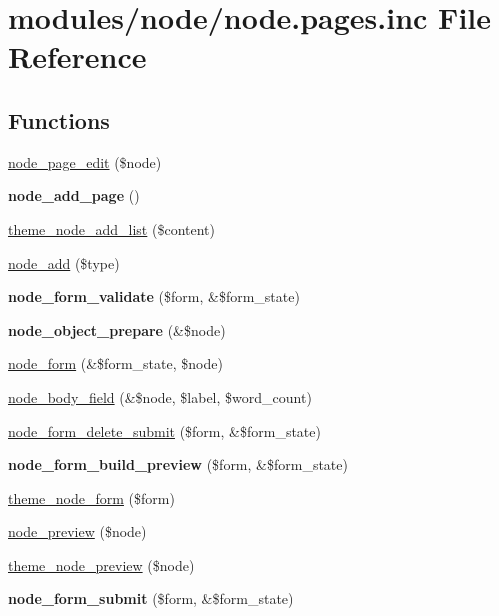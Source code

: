 \hypertarget{node_8pages_8inc}{
\section{modules/node/node.pages.inc File Reference}
\label{node_8pages_8inc}
}
\subsection*{Functions}
\begin{CompactItemize}
\item 
\hyperlink{node_8pages_8inc_553fc35bb17545341a3fcc36360fb43b}{node\_\-page\_\-edit} (\$node)
\item 
\hypertarget{node_8pages_8inc_c51e34d673a1de68491ea88ea30832b9}{
\textbf{node\_\-add\_\-page} ()}
\label{node_8pages_8inc_c51e34d673a1de68491ea88ea30832b9}

\item 
\hyperlink{group__themeable_g8eb0074d64a1c80291b651316f9b0659}{theme\_\-node\_\-add\_\-list} (\$content)
\item 
\hyperlink{node_8pages_8inc_29be8dfd0fadad9f4399d50ab3615461}{node\_\-add} (\$type)
\item 
\hypertarget{node_8pages_8inc_edf9f810594bc4c402a92cb197930bd9}{
\textbf{node\_\-form\_\-validate} (\$form, \&\$form\_\-state)}
\label{node_8pages_8inc_edf9f810594bc4c402a92cb197930bd9}

\item 
\hypertarget{node_8pages_8inc_26ccc9a4ef05bacb4b1f35af1e5937d4}{
\textbf{node\_\-object\_\-prepare} (\&\$node)}
\label{node_8pages_8inc_26ccc9a4ef05bacb4b1f35af1e5937d4}

\item 
\hyperlink{node_8pages_8inc_0f0be559fe5085e67454b0bd73b1b282}{node\_\-form} (\&\$form\_\-state, \$node)
\item 
\hyperlink{node_8pages_8inc_9d45bd087e06dbb6570dd7e9f453c7e6}{node\_\-body\_\-field} (\&\$node, \$label, \$word\_\-count)
\item 
\hyperlink{node_8pages_8inc_5cdd62f89098801ac87b85d8c61e7ee2}{node\_\-form\_\-delete\_\-submit} (\$form, \&\$form\_\-state)
\item 
\hypertarget{node_8pages_8inc_71425b02d4c0dd3af239bffdd7e1649b}{
\textbf{node\_\-form\_\-build\_\-preview} (\$form, \&\$form\_\-state)}
\label{node_8pages_8inc_71425b02d4c0dd3af239bffdd7e1649b}

\item 
\hyperlink{group__themeable_g446a4c85c20acb7a6447d0acbe0d0210}{theme\_\-node\_\-form} (\$form)
\item 
\hyperlink{node_8pages_8inc_774d9df7be341a7c9058555e8cfb4b2b}{node\_\-preview} (\$node)
\item 
\hyperlink{group__themeable_gfd0ecfb60057deb25b781a272a45a3a7}{theme\_\-node\_\-preview} (\$node)
\item 
\hypertarget{node_8pages_8inc_ddb125e26be73cec8769d2e729d7aa2c}{
\textbf{node\_\-form\_\-submit} (\$form, \&\$form\_\-state)}
\label{node_8pages_8inc_ddb125e26be73cec8769d2e729d7aa2c}


\end{CompactItemize}
